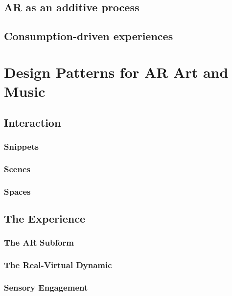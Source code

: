 \subsection{AR as an additive process}\label{sec: method-resistance-additive}

\subsection{Consumption-driven experiences}\label{sec: method-resistance-consumer}



\section{Design Patterns for AR Art and Music} \label{sec: method-patterns}
\subsection{Interaction}
\subsubsection{Snippets}
\subsubsection{Scenes}
\subsubsection{Spaces}

\subsection{The Experience}
\subsubsection{The AR Subform}
\subsubsection{The Real-Virtual Dynamic}
\subsubsection{Sensory Engagement}

